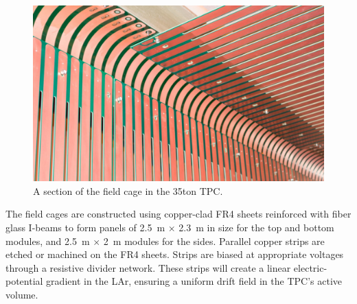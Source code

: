 



\begin{figure}[htb]
\centering
\includegraphics[width=.49\textwidth]{figures/TPC_FCA_1}
\caption{A section of the field cage in the 35ton TPC.}
\label{fig:tpc_fca_1}
\end{figure}    

   

The field cages are constructed using copper-clad FR4 sheets reinforced with fiber glass I-beams to form panels of 2.5~m $\times$ 2.3~m in size for the top and bottom modules, and 2.5~m $\times$ 2~m modules for the sides.  Parallel copper strips are etched or machined on the FR4 sheets.  Strips are biased at appropriate voltages through a resistive divider network. These strips will create a linear electric-potential gradient in the LAr, ensuring a uniform drift field in the TPC's active volume. 
 


